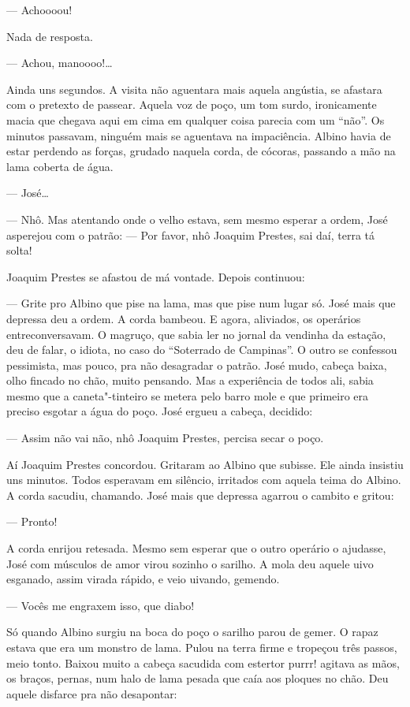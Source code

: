 \begin{linenumbers}
--- Achoooou!

Nada de resposta.

--- Achou, manoooo!\ldots{}

Ainda uns segundos. A visita não aguentara mais aquela angústia, se
afastara com o pretexto de passear. Aquela voz de poço, um tom surdo,
ironicamente macia que chegava aqui em cima em qualquer coisa parecia
com um ``não''. Os minutos passavam, ninguém mais se aguentava na
impaciência. Albino havia de estar perdendo as forças, grudado naquela
corda, de cócoras, passando a mão na lama coberta de água.

--- José\ldots{}

--- Nhô. Mas atentando onde o velho estava, sem mesmo esperar a ordem,
José asperejou com o patrão: --- Por favor, nhô Joaquim Prestes, sai
daí, terra tá solta!

Joaquim Prestes se afastou de má vontade. Depois continuou:

--- Grite pro Albino que pise na lama, mas que pise num lugar só. José
mais que depressa deu a ordem. A corda bambeou. E agora, aliviados, os
operários entreconversavam. O magruço, que sabia ler no jornal da
vendinha da estação, deu de falar, o idiota, no caso do ``Soterrado de
Campinas''. O outro se confessou pessimista, mas pouco, pra não
desagradar o patrão. José mudo, cabeça baixa, olho fincado no chão,
muito pensando. Mas a experiência de todos ali, sabia mesmo que a
caneta"-tinteiro se metera pelo barro mole e que primeiro era preciso
esgotar a água do poço. José ergueu a cabeça, decidido:

--- Assim não vai não, nhô Joaquim Prestes, percisa secar o poço.

Aí Joaquim Prestes concordou. Gritaram ao Albino que subisse. Ele ainda
insistiu uns minutos. Todos esperavam em silêncio, irritados com aquela
teima do Albino. A corda sacudiu, chamando. José mais que depressa
agarrou o cambito e gritou:

--- Pronto!

A corda enrijou retesada. Mesmo sem esperar que o outro operário o
ajudasse, José com músculos de amor virou sozinho o sarilho. A mola deu
aquele uivo esganado, assim virada rápido, e veio uivando, gemendo.

--- Vocês me engraxem isso, que diabo!

Só quando Albino surgiu na boca do poço o sarilho parou de gemer. O
rapaz estava que era um monstro de lama. Pulou na terra firme e tropeçou
três passos, meio tonto. Baixou muito a cabeça sacudida com estertor
purrr! agitava as mãos, os braços, pernas, num halo de lama pesada que
caía aos ploques no chão. Deu aquele disfarce pra não desapontar:


\end{linenumbers}
